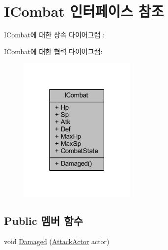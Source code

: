 \hypertarget{interface_i_combat}{}\section{I\+Combat 인터페이스 참조}
\label{interface_i_combat}


I\+Combat에 대한 상속 다이어그램 \+: 


I\+Combat에 대한 협력 다이어그램\+:\nopagebreak
\begin{figure}[H]
\begin{center}
\leavevmode
\includegraphics[width=163pt]{interface_i_combat__coll__graph}
\end{center}
\end{figure}
\subsection*{Public 멤버 함수}
\begin{DoxyCompactItemize}
\item 
void \hyperlink{interface_i_combat_ab8df637ef6ddd1c4a0689cafba32f3b9}{Damaged} (\hyperlink{class_attack_actor}{Attack\+Actor} actor)
\end{DoxyCompactItemize}
